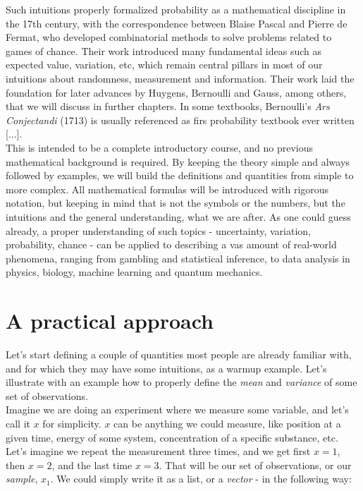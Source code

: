 \documentclass{book}
\begin{document}
Such intuitions properly formalized probability as a mathematical discipline in the 17th century, with the correspondence between Blaise Pascal and Pierre de Fermat, who developed combinatorial methods to solve problems related to games of chance. Their work introduced many fundamental ideas such as expected value, variation, etc, which remain central pillars in most of our intuitions about randomness, measurement and information. Their work laid the foundation for later advances by Huygens, Bernoulli and Gauss, among others, that we will discuss in further chapters. In some textbooks, Bernoulli’s \textit{Ars Conjectandi} (1713) is usually referenced as firs probability textbook ever written [...].\\

This is intended to be a complete introductory course, and no previous mathematical background is required. By keeping the theory simple and always followed by examples, we will build the definitions and quantities from simple to more complex. All mathematical formulas will be introduced with rigorous notation, but keeping in mind that is not the symbols or the numbers, but the intuitions and the general understanding, what we are after. As one could guess already, a proper understanding of such topics - uncertainty, variation, probability, chance - can be applied to describing a vas amount of real-world phenomena, ranging from gambling and statistical inference, to data analysis in physics, biology, machine learning and quantum mechanics. \\

\section{A practical approach}

Let's start defining a couple of quantities most people are already familiar with, and for which they may have some intuitions, as a warmup example. Let's illustrate with an example how to properly define the \textit{mean} and \textit{variance} of some set of observations.\\
	
Imagine we are doing an experiment where we measure some variable, and let's call it $x$ for simplicity. $x$ can be anything we could measure, like position at a given time, energy of some system, concentration of a specific substance, etc. Let's imagine we repeat the measurement three times, and we get first $x = 1$, then $x = 2$, and the last time $x = 3$. That will be our set of observations, or our \textit{sample}, $x_{1}$. We could simply write it as a list, or a \textit{vector} - in the following way:
\end{document}
